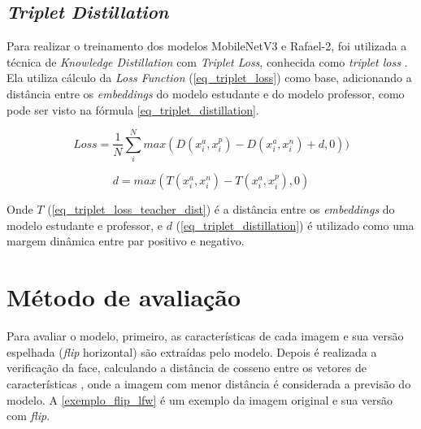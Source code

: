 \subsection{\textit{Triplet Distillation}}
Para realizar o treinamento dos modelos MobileNetV3 e Rafael-2, foi utilizada a técnica de
\textit{Knowledge Distillation} \cite{hinton2015distilling} com \textit{Triplet Loss}, conhecida como
\textit{triplet loss} \cite{triplet_distillation_face_recognition}.
Ela utiliza cálculo da \textit{Loss Function} (\ref{eq_triplet_loss}) como base, adicionando a distância entre os
\textit{embeddings} do modelo estudante e do modelo professor, como pode ser visto na fórmula
\ref{eq_triplet_distillation}.

\begin{equation}\label{eq_triplet_distillation}
	Loss = \frac 1 N \sum _i ^N max(D(x_i^a, x_i^p) - D(x_i^a, x_i^n) + d, 0))
\end{equation}

\begin{equation}\label{eq_triplet_loss_teacher_dist}
	d = max(T(x_i^a, x_i^n) - T(x_i^a, x_i^p), 0)
\end{equation}

Onde $T$ (\ref{eq_triplet_loss_teacher_dist}) é a distância entre os \textit{embeddings} do modelo estudante e
professor, e $d$ (\ref{eq_triplet_distillation}) é utilizado como uma margem dinâmica entre par positivo e negativo.


\section{Método de avaliação}\label{sec_avaliacao_modelo}
Para avaliar o modelo, primeiro, as características de cada imagem e sua versão espelhada
(\textit{flip} horizontal) são extraídas pelo modelo. Depois é realizada a verificação da face,
calculando a distância de cosseno entre os vetores de características
\cite{triplet_distillation_face_recognition}, onde a imagem com menor distância é considerada a previsão do
modelo. A \autoref{exemplo_flip_lfw} é um exemplo da imagem original e sua versão com \textit{flip}.

